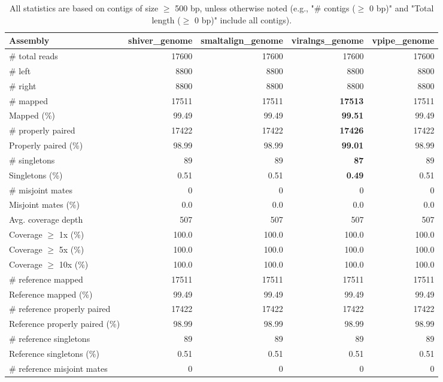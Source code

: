 \documentclass[12pt,a4paper]{article}
\begin{document}
\begin{table}[ht]
\begin{center}
\caption{All statistics are based on contigs of size $\geq$ 500 bp, unless otherwise noted (e.g., "\# contigs ($\geq$ 0 bp)" and "Total length ($\geq$ 0 bp)" include all contigs).}
\begin{tabular}{|l*{4}{|r}|}
\hline
Assembly & shiver\_genome & smaltalign\_genome & viralngs\_genome & vpipe\_genome \\ \hline
\# total reads & 17600 & 17600 & 17600 & 17600 \\ \hline
\# left & 8800 & 8800 & 8800 & 8800 \\ \hline
\# right & 8800 & 8800 & 8800 & 8800 \\ \hline
\# mapped & 17511 & 17511 & {\bf 17513} & 17511 \\ \hline
Mapped (\%) & 99.49 & 99.49 & {\bf 99.51} & 99.49 \\ \hline
\# properly paired & 17422 & 17422 & {\bf 17426} & 17422 \\ \hline
Properly paired (\%) & 98.99 & 98.99 & {\bf 99.01} & 98.99 \\ \hline
\# singletons & 89 & 89 & {\bf 87} & 89 \\ \hline
Singletons (\%) & 0.51 & 0.51 & {\bf 0.49} & 0.51 \\ \hline
\# misjoint mates & 0 & 0 & 0 & 0 \\ \hline
Misjoint mates (\%) & 0.0 & 0.0 & 0.0 & 0.0 \\ \hline
Avg. coverage depth & 507 & 507 & 507 & 507 \\ \hline
Coverage $\geq$ 1x (\%) & 100.0 & 100.0 & 100.0 & 100.0 \\ \hline
Coverage $\geq$ 5x (\%) & 100.0 & 100.0 & 100.0 & 100.0 \\ \hline
Coverage $\geq$ 10x (\%) & 100.0 & 100.0 & 100.0 & 100.0 \\ \hline
\# reference mapped & 17511 & 17511 & 17511 & 17511 \\ \hline
Reference mapped (\%) & 99.49 & 99.49 & 99.49 & 99.49 \\ \hline
\# reference properly paired & 17422 & 17422 & 17422 & 17422 \\ \hline
Reference properly paired (\%) & 98.99 & 98.99 & 98.99 & 98.99 \\ \hline
\# reference singletons & 89 & 89 & 89 & 89 \\ \hline
Reference singletons (\%) & 0.51 & 0.51 & 0.51 & 0.51 \\ \hline
\# reference misjoint mates & 0 & 0 & 0 & 0 \\ \hline

\end{tabular}
\end{center}
\end{table}
\end{document}
